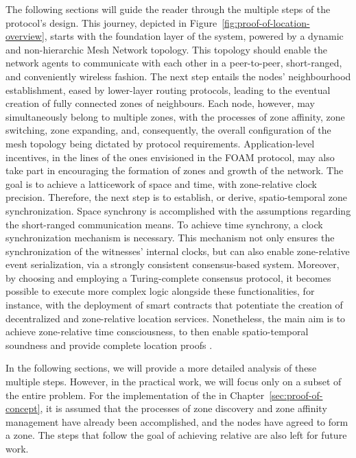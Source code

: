 The following sections will guide the reader through the multiple steps of the protocol's design. This journey, depicted in Figure~\ref{fig:proof-of-location-overview}, starts with the foundation layer of the system, powered by a dynamic and non-hierarchic Mesh Network topology. This topology should enable the network agents to communicate with each other in a peer-to-peer, short-ranged, and conveniently wireless fashion. The next step entails the nodes' neighbourhood establishment, eased by lower-layer routing protocols, leading to the eventual creation of fully connected zones of neighbours. Each node, however, may simultaneously belong to multiple zones, with the processes of zone affinity, zone switching, zone expanding, and, consequently, the overall configuration of the mesh topology being dictated by protocol requirements. Application-level incentives, in the lines of the ones envisioned in the FOAM protocol, may also take part in encouraging the formation of zones and growth of the network. The goal is to achieve a latticework of space and time, with zone-relative clock precision. Therefore, the next step is to establish, or derive, spatio-temporal zone synchronization. Space synchrony is accomplished with the assumptions regarding the short-ranged communication means. To achieve time synchrony, a clock synchronization mechanism is necessary. This mechanism not only ensures the synchronization of the witnesses' internal clocks, but can also enable zone-relative event serialization, via a strongly consistent consensus-based system. Moreover, by choosing and employing a Turing-complete consensus protocol, it becomes possible to execute more complex logic alongside these functionalities, for instance, with the deployment of smart contracts that potentiate the creation of decentralized and zone-relative location services. Nonetheless, the main aim is to achieve zone-relative time consciousness, to then enable spatio-temporal soundness and provide complete location proofs \cite{nasrulin2018robust}.

In the following sections, we will provide a more detailed analysis of these multiple steps. However, in the practical work, we will focus only on a subset of the entire problem. For the implementation of the \poc{} in Chapter~\ref{sec:proof-of-concept}, it is assumed that the processes of zone discovery and zone affinity management have already been accomplished, and the nodes have agreed to form a zone. The steps that follow the goal of achieving relative \pol{} are also left for future work.
